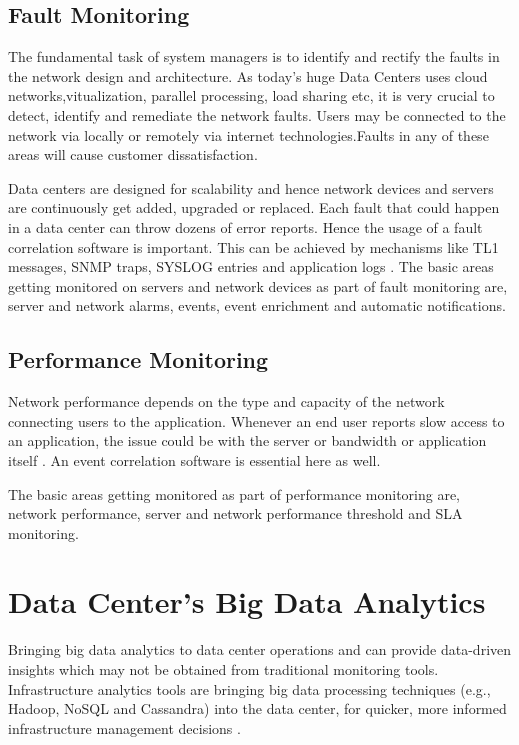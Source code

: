 \documentclass[sigconf]{acmart}
\begin{document}
\subsection{Fault Monitoring}

The fundamental task of system managers is to identify and rectify the faults in the network design and architecture. As today's huge Data Centers uses cloud networks,vitualization, parallel processing, load sharing etc, it is very crucial to detect, identify and remediate the network faults. Users may be connected to the network via locally or remotely via internet technologies.Faults in any of these areas will cause customer dissatisfaction. 

Data centers are designed for scalability and hence network devices and servers are continuously get added, upgraded or replaced. Each fault that could happen in a data center can throw dozens of error reports. Hence the usage of a fault correlation software is important. This can be achieved by mechanisms like TL1 messages, SNMP traps, SYSLOG entries and application logs \cite{network-fault-management-in-todays-complex-data-centers}. The basic areas getting monitored on servers and network devices as part of fault monitoring are, server and network alarms, events, event enrichment and automatic notifications.

\subsection{Performance Monitoring}

Network performance depends on the type and capacity of the network connecting users to the application. Whenever an end user reports slow access to an application, the issue could be with the server or bandwidth or application itself \cite{network-monitoring-datacenter-management}. An event correlation software is essential here as well.

The basic areas getting monitored as part of performance monitoring are, network performance, server and network performance threshold and SLA monitoring.

\section{Data Center's Big Data Analytics}

Bringing big data analytics to data center operations and can provide data-driven insights which may not be obtained from traditional monitoring tools. Infrastructure analytics tools are bringing big data processing techniques (e.g., Hadoop, NoSQL and Cassandra) into the data center, for quicker, more informed infrastructure management decisions \cite{IT-analytics-tools-bring-big-data-to-work-in-the-data-center}.
\end{document}
